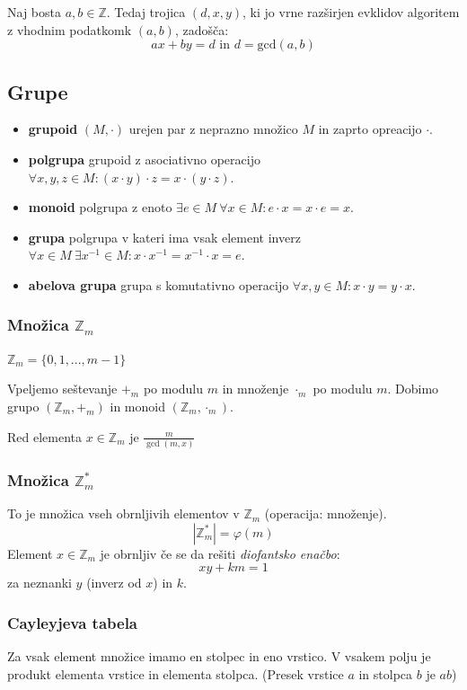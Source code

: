 \begin{multicols}{5}
Naj bosta $a, b \in \mathbb{Z}$. Tedaj trojica $(d, x, y)$, ki jo vrne razširjen evklidov algoritem z vhodnim podatkomk $(a, b)$, zadošča:
\[ax + by = d \text{ in } d = \textrm{gcd}(a, b)\] 


\subsection*{Grupe}
\begin{itemize}
    \item \textbf{grupoid} $(M, \cdot)$ urejen par z neprazno množico $M$ in zaprto opreacijo $\cdot$.
    \item \textbf{polgrupa} grupoid z asociativno operacijo $ \forall x,y,z \in M : (x\cdot y)\cdot z = x\cdot (y\cdot z)$.
    \item \textbf{monoid} polgrupa z enoto $ \exists e \in M \ \forall x \in M : e\cdot x = x\cdot e = x$.
    \item \textbf{grupa} polgrupa v kateri ima vsak element inverz $ \forall x \in M \ \exists x^{-1} \in M : x\cdot x^{-1} = x^{-1}\cdot x = e$.
    \item \textbf{abelova grupa} grupa s komutativno operacijo $ \forall x,y \in M  : x\cdot y = y\cdot x$.
\end{itemize} 

\subsubsection{Množica $\mathbb{Z}_m$}
$\mathbb{Z}_m = \{0,1,...,m-1\}$

Vpeljemo seštevanje $+_m$ po modulu $m$ in množenje $\cdot_m$ po modulu $m$. 
Dobimo grupo $(\mathbb{Z}_m, +_m)$ in monoid $(\mathbb{Z}_m, \cdot_m)$.

Red elementa $x\in \mathbb{Z}_m$ je $\frac{m}{\gcd(m,x)}$

\subsubsection{Množica $\mathbb{Z}_m^*$}
To je množica vseh obrnljivih elementov v $\mathbb{Z}_m$ (operacija: množenje).
\[|\mathbb{Z}^*_m| = \varphi(m)\]
Element $x\in \mathbb{Z}_m$ je obrnljiv če se da rešiti \emph{diofantsko enačbo}:
\[ xy + km = 1\]
za neznanki $y$ (inverz od $x$) in $k$.

\subsubsection{Cayleyjeva tabela}
Za vsak element množice imamo en stolpec in eno vrstico. V vsakem polju je produkt elementa vrstice in elementa stolpca.
(Presek vrstice $a$ in stolpca $b$ je $ab$)


\end{multicols}
